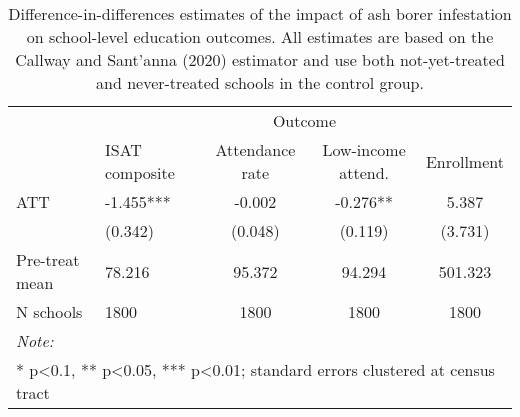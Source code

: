 \begin{table}[!h]

\caption{\label{tab:school-educ-table}Difference-in-differences estimates of the impact of ash borer infestation on school-level education outcomes. All estimates are based on the Callway and Sant'anna (2020) estimator and use both not-yet-treated and never-treated schools in the control group.}
\centering
\begin{tabular}[t]{llccc}
\toprule
\multicolumn{1}{c}{ } & \multicolumn{4}{c}{Outcome} \\
\cmidrule(l{3pt}r{3pt}){2-5}
  & ISAT composite & Attendance rate & Low-income attend. & Enrollment\\
\midrule
ATT & -1.455*** & -0.002 & -0.276** & 5.387\\
 & (0.342) & (0.048) & (0.119) & (3.731)\\
\midrule
Pre-treat mean & 78.216 & 95.372 & 94.294 & 501.323\\
N schools & 1800 & 1800 & 1800 & 1800\\
\bottomrule
\multicolumn{5}{l}{\rule{0pt}{1em}\textit{Note: }}\\
\multicolumn{5}{l}{\rule{0pt}{1em}* p<0.1, ** p<0.05, *** p<0.01; standard errors clustered at census tract}\\
\end{tabular}
\end{table}
